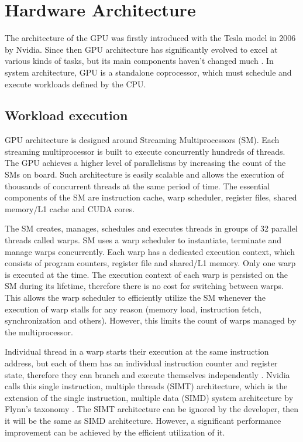 \section{Hardware Architecture}

The architecture of the GPU was firstly introduced with the Tesla model in 2006 by Nvidia.
Since then GPU architecture has significantly evolved to excel at various kinds of tasks, but its main components haven’t changed much \cite{NVIDIAGPUHistory}.
In system architecture, GPU is a standalone coprocessor, which must schedule and execute workloads defined by the CPU.

\subsection{Workload execution}

GPU architecture is designed around Streaming Multiprocessors (SM).
Each streaming multiprocessor is built to execute concurrently hundreds of threads.
The GPU achieves a higher level of parallelisms by increasing the count of the SMs on board.
Such architecture is easily scalable and allows the execution of thousands of concurrent threads at the same period of time.
The essential components of the SM are instruction cache, warp scheduler, register files, shared memory/L1 cache and CUDA cores.

The SM creates, manages, schedules and executes threads in groups of 32 parallel threads called warps.
SM uses a warp scheduler to instantiate, terminate and manage warps concurrently.
Each warp has a dedicated execution context, which consists of program counters, register file and shared/L1 memory.
Only one warp is executed at the time.
The execution context of each warp is persisted on the SM during its lifetime, therefore there is no cost for switching between warps.
This allows the warp scheduler to efficiently utilize the SM whenever the execution of warp stalls for any reason (memory load, instruction fetch, synchronization and others).
However, this limits the count of warps managed by the multiprocessor.

Individual thread in a warp starts their execution at the same instruction address, but each of them has an individual instruction counter and register state, therefore they can branch and execute themselves independently \cite{CUDAProgramming}.
Nvidia calls this single instruction, multiple threads (SIMT) architecture, which is the extension of the single instruction, multiple data (SIMD) system architecture by Flynn’s taxonomy \cite{FlynnTaxonomy}.
The SIMT architecture can be ignored by the developer, then it will be the same as SIMD architecture.
However, a significant performance improvement can be achieved by the efficient utilization of it.

